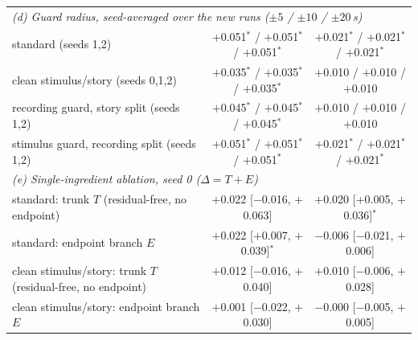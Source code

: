 \begin{tabular}{lcc}
\midrule\multicolumn{3}{l}{\emph{(d) Guard radius, seed-averaged over the new runs ($\pm5$ / $\pm10$ / $\pm20$\,s)}}\\
standard (seeds 1,2) & $+$0.051$^{*}$ / $+$0.051$^{*}$ / $+$0.051$^{*}$ & $+$0.021$^{*}$ / $+$0.021$^{*}$ / $+$0.021$^{*}$ \\
clean stimulus/story (seeds 0,1,2) & $+$0.035$^{*}$ / $+$0.035$^{*}$ / $+$0.035$^{*}$ & $+$0.010 / $+$0.010 / $+$0.010 \\
recording guard, story split (seeds 1,2) & $+$0.045$^{*}$ / $+$0.045$^{*}$ / $+$0.045$^{*}$ & $+$0.010 / $+$0.010 / $+$0.010 \\
stimulus guard, recording split (seeds 1,2) & $+$0.051$^{*}$ / $+$0.051$^{*}$ / $+$0.051$^{*}$ & $+$0.021$^{*}$ / $+$0.021$^{*}$ / $+$0.021$^{*}$ \\
\midrule\multicolumn{3}{l}{\emph{(e) Single-ingredient ablation, seed 0 ($\Delta=T+E$)}}\\
standard: trunk $T$ (residual-free, no endpoint) & $+$0.022 {\scriptsize[$-$0.016, $+$0.063]} & $+$0.020 {\scriptsize[$+$0.005, $+$0.036]}$^{*}$ \\
standard: endpoint branch $E$ & $+$0.022 {\scriptsize[$+$0.007, $+$0.039]}$^{*}$ & $-$0.006 {\scriptsize[$-$0.021, $+$0.006]} \\
clean stimulus/story: trunk $T$ (residual-free, no endpoint) & $+$0.012 {\scriptsize[$-$0.016, $+$0.040]} & $+$0.010 {\scriptsize[$-$0.006, $+$0.028]} \\
clean stimulus/story: endpoint branch $E$ & $+$0.001 {\scriptsize[$-$0.022, $+$0.030]} & $-$0.000 {\scriptsize[$-$0.005, $+$0.005]} \\
\bottomrule
\end{tabular}

